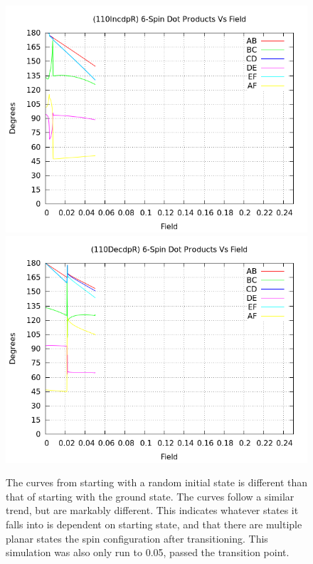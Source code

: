 \documentclass{article}
\begin{document}
\begin{figure}[ht]
\centering
\includegraphics[scale=0.5]{HVariedData/Pictures/110IncdpR.png}
\includegraphics[scale=0.5]{HVariedData/Pictures/110DecdpR.png}
\caption{The curves from starting with a random initial state is different than that of starting with the ground state.
The curves follow a similar trend, but are markably different. This indicates whatever states it falls into is
dependent on starting state, and that there are multiple planar states the spin configuration after transitioning. 
This simulation was also only run to 0.05, passed the transition point.}
\end{figure}
\clearpage
\end{document}
